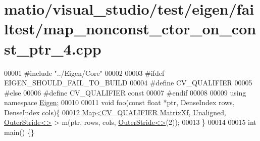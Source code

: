\hypertarget{matio_2visual__studio_2test_2eigen_2failtest_2map__nonconst__ctor__on__const__ptr__4_8cpp_source}{}\section{matio/visual\+\_\+studio/test/eigen/failtest/map\+\_\+nonconst\+\_\+ctor\+\_\+on\+\_\+const\+\_\+ptr\+\_\+4.cpp}
\label{matio_2visual__studio_2test_2eigen_2failtest_2map__nonconst__ctor__on__const__ptr__4_8cpp_source}

\begin{DoxyCode}
00001 \textcolor{preprocessor}{#include "../Eigen/Core"}
00002 
00003 \textcolor{preprocessor}{#ifdef EIGEN\_SHOULD\_FAIL\_TO\_BUILD}
00004 \textcolor{preprocessor}{#define CV\_QUALIFIER}
00005 \textcolor{preprocessor}{#else}
00006 \textcolor{preprocessor}{#define CV\_QUALIFIER const}
00007 \textcolor{preprocessor}{#endif}
00008 
00009 \textcolor{keyword}{using namespace }\hyperlink{namespace_eigen}{Eigen};
00010 
00011 \textcolor{keywordtype}{void} foo(\textcolor{keyword}{const} \textcolor{keywordtype}{float} *ptr, DenseIndex rows, DenseIndex cols)\{
00012     \hyperlink{group___core___module_class_eigen_1_1_map}{Map<CV\_QUALIFIER MatrixXf, Unaligned, OuterStride<>} 
      > m(ptr, rows, cols, \hyperlink{class_eigen_1_1_outer_stride}{OuterStride<>}(2));
00013 \}
00014 
00015 \textcolor{keywordtype}{int} main() \{\}
\end{DoxyCode}

